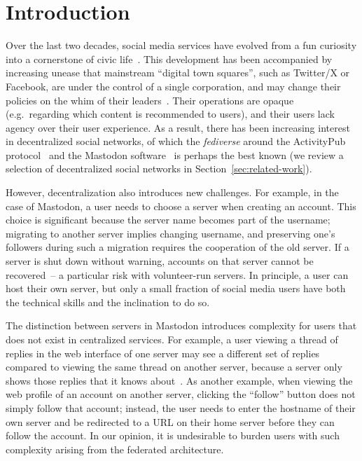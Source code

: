 \documentclass[sigconf,review]{acmart}
\begin{document}

\maketitle

\section{Introduction}

Over the last two decades, social media services have evolved from a fun curiosity into a cornerstone of civic life~\cite{Barabas:2017}.
This development has been accompanied by increasing unease that mainstream ``digital town squares'', such as Twitter/X or Facebook, are under the control of a single corporation, and may change their policies on the whim of their leaders~\cite{Yeung:2023}.
Their operations are opaque (e.g.\ regarding which content is recommended to users), and their users lack agency over their user experience.
As a result, there has been increasing interest in decentralized social networks, of which the \emph{fediverse} around the ActivityPub protocol~\cite{ActivityPub} and the Mastodon software~\cite{Mastodon} is perhaps the best known (we review a selection of decentralized social networks in Section~\ref{sec:related-work}).

However, decentralization also introduces new challenges.
For example, in the case of Mastodon, a user needs to choose a server when creating an account.
This choice is significant because the server name becomes part of the username; migrating to another server implies changing username, and preserving one's followers during such a migration requires the cooperation of the old server.
If a server is shut down without warning, accounts on that server cannot be recovered~-- a particular risk with volunteer-run servers.
In principle, a user can host their own server, but only a small fraction of social media users have both the technical skills and the inclination to do so.

The distinction between servers in Mastodon introduces complexity for users that does not exist in centralized services.
For example, a user viewing a thread of replies in the web interface of one server may see a different set of replies compared to viewing the same thread on another server, because a server only shows those replies that it knows about~\cite{Adida:2022}.
As another example, when viewing the web profile of an account on another server, clicking the ``follow'' button does not simply follow that account; instead, the user needs to enter the hostname of their own server and be redirected to a URL on their home server before they can follow the account.
In our opinion, it is undesirable to burden users with such complexity arising from the federated architecture.
\end{document}
